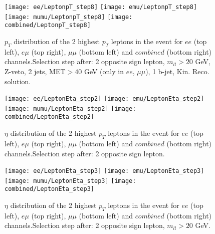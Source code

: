 \clearpage
\newpage


\begin{figure}
  \texttt{[image: ee/LeptonpT\_step8]}
  \texttt{[image: emu/LeptonpT\_step8]}\\
  \texttt{[image: mumu/LeptonpT\_step8]}
  \texttt{[image: combined/LeptonpT\_step8]}
\caption{$p_T$ distribution of the 2 highest $p_T$ leptons in the event for $ee$ (top left), $e\mu$ (top right), $\mu\mu$ (bottom left) and $combined$ (bottom right) channels.\newline Selection step after: 2 opposite sign lepton, $m_{ll}>20$ GeV, Z-veto, 2 jets, MET$>40$ GeV (only in $ee$, $\mu\mu$), 1 b-jet, Kin. Reco. solution.}
\end{figure}

\clearpage
\newpage





\begin{figure}
  \texttt{[image: ee/LeptonEta\_step2]}
  \texttt{[image: emu/LeptonEta\_step2]}\\
  \texttt{[image: mumu/LeptonEta\_step2]}
  \texttt{[image: combined/LeptonEta\_step2]}
\caption{$\eta$ distribution of the 2 highest $p_T$ leptons in the event for $ee$ (top left), $e\mu$ (top right), $\mu\mu$ (bottom left) and $combined$ (bottom right) channels.\newline Selection step after: 2 opposite sign lepton.}
\end{figure}

\clearpage
\newpage

\begin{figure}
  \texttt{[image: ee/LeptonEta\_step3]}
  \texttt{[image: emu/LeptonEta\_step3]}\\
  \texttt{[image: mumu/LeptonEta\_step3]}
  \texttt{[image: combined/LeptonEta\_step3]}
\caption{$\eta$ distribution of the 2 highest $p_T$ leptons in the event for $ee$ (top left), $e\mu$ (top right), $\mu\mu$ (bottom left) and $combined$ (bottom right) channels.\newline Selection step after: 2 opposite sign lepton, $m_{ll}>20$ GeV.}
\end{figure}

